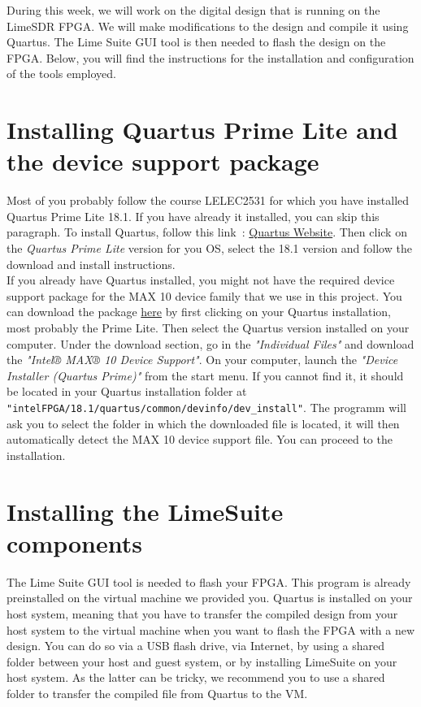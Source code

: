 
During this week, we will work on the digital design that is running on the LimeSDR FPGA. We will make modifications to the design and compile it using Quartus. The Lime Suite GUI tool is then needed to flash the design on the FPGA. Below, you will find the instructions for the installation and configuration of the tools employed.\\

\section{Installing Quartus Prime Lite and the device support package}

Most of you probably follow the course LELEC2531 for which you have installed Quartus Prime Lite 18.1. If you have already  it installed, you can skip this paragraph. To install Quartus, follow this link~: \href{https://www.intel.com/content/www/us/en/products/details/fpga/development-tools/quartus-prime/resource.html}{Quartus Website}. Then click on the \textit{Quartus Prime Lite} version for you OS, select the 18.1 version and follow the download and install instructions.\\

If you already have Quartus installed, you might not have the required device support package for the MAX 10 device family that we use in this project. You can download the package \href{https://www.intel.com/content/www/us/en/products/details/fpga/development-tools/quartus-prime/resource.html}{here} by first clicking on your Quartus installation, most probably the Prime Lite. Then select the Quartus version installed on your computer.
Under the download section, go in the \textit{"Individual Files"} and download the \textit{"Intel® MAX® 10 Device Support"}. On your computer, launch the \textit{"Device Installer (Quartus Prime)"} from the start menu. If you cannot find it, it should be located in your Quartus installation folder at \texttt{"intelFPGA/18.1/quartus/common/devinfo/dev\_install"}.
The programm will ask you to select the folder in which the downloaded file is located, it will then automatically detect the MAX 10 device support file. You can proceed to the installation.

\section{Installing the LimeSuite components}
   
The Lime Suite GUI tool is needed to flash your FPGA. This program is already preinstalled on the virtual machine we provided you. Quartus is installed on your host system, meaning that you have to transfer the compiled design from your host system to the virtual machine when you want to flash the FPGA with a new design. You can do so via a USB flash drive, via Internet, by using a shared folder between your host and guest system, or by installing LimeSuite on your host system. As the latter can be tricky, we recommend you to use a shared folder to transfer the compiled file from Quartus to the VM.

